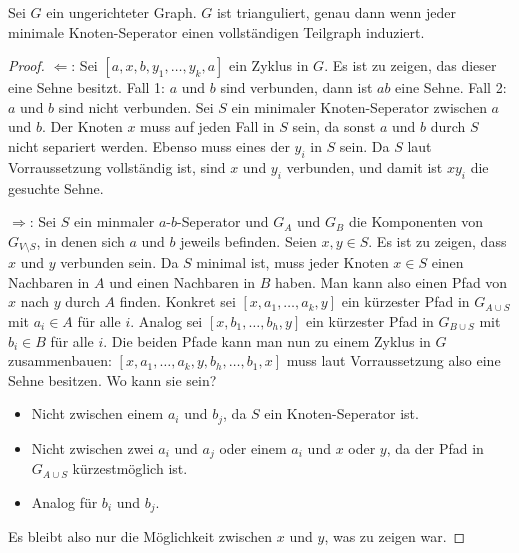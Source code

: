 \documentclass[../main.tex]{subfiles}
\begin{document}
\begin{satz}
    Sei $G$ ein ungerichteter Graph. $G$ ist trianguliert, genau dann wenn jeder minimale Knoten-Seperator einen vollständigen Teilgraph induziert.
\end{satz}

\begin{proof}
    $\Leftarrow$: Sei $[a, x, b, y_1, \hdots, y_k, a]$ ein Zyklus in $G$. Es ist zu zeigen, das dieser eine Sehne besitzt. Fall 1: $a$ und $b$ sind verbunden, dann ist $ab$ eine Sehne. Fall 2: $a$ und $b$ sind nicht verbunden. Sei $S$ ein minimaler Knoten-Seperator zwischen $a$ und $b$. Der Knoten $x$ muss auf jeden Fall in $S$ sein, da sonst $a$ und $b$ durch $S$ nicht separiert werden. Ebenso muss eines der $y_i$ in $S$ sein. Da $S$ laut Vorraussetzung vollständig ist, sind $x$ und $y_i$ verbunden, und damit ist $xy_i$ die gesuchte Sehne.

    $\Rightarrow$: Sei $S$ ein minmaler $a$-$b$-Seperator und $G_A$ und $G_B$ die Komponenten von $G_{V \setminus S}$, in denen sich $a$ und $b$ jeweils befinden. Seien $x, y \in S$. Es ist zu zeigen, dass $x$ und $y$ verbunden sein. Da $S$ minimal ist, muss jeder Knoten $x \in S$ einen Nachbaren in $A$ und einen Nachbaren in $B$ haben. Man kann also einen Pfad von $x$ nach $y$ durch $A$ finden. Konkret sei $[x, a_1, \hdots, a_k, y]$ ein kürzester Pfad in $G_{A \cup S}$ mit $a_i \in A$ für alle $i$. Analog sei $[x, b_1, \hdots, b_h, y]$ ein kürzester Pfad in $G_{B \cup S}$ mit $b_i \in B$ für alle $i$. Die beiden Pfade kann man nun zu einem Zyklus in $G$ zusammenbauen: $[x, a_1, \hdots, a_k, y, b_h, \hdots, b_1, x]$ muss laut Vorraussetzung also eine Sehne besitzen. Wo kann sie sein?
    
    \begin{itemize}
        \item Nicht zwischen einem $a_i$ und $b_j$, da $S$ ein Knoten-Seperator ist.
        \item Nicht zwischen zwei $a_i$ und $a_j$ oder einem $a_i$ und $x$ oder $y$, da der Pfad in $G_{A \cup S}$ kürzestmöglich ist.
        \item Analog für $b_i$ und $b_j$.
    \end{itemize}
    Es bleibt also nur die Möglichkeit zwischen $x$ und $y$, was zu zeigen war.
\end{proof}
        
\end{document}
